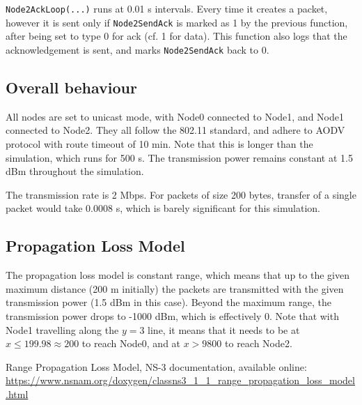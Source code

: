 \documentclass[11pt,journal]{article}
\begin{document}
	\texttt{Node2AckLoop(...)} runs at 0.01 s intervals. Every time it creates a packet, however it is sent only if \texttt{Node2SendAck} is marked as 1 by the previous function, after being set to type 0 for ack (cf. 1 for data). This function also logs that the acknowledgement is sent, and marks \texttt{Node2SendAck} back to 0.
	
	\subsection{Overall behaviour}
	
	All nodes are set to unicast mode, with Node0 connected to Node1, and Node1 connected to Node2. They all follow the 802.11 standard, and adhere to AODV protocol with route timeout of 10 min. Note that this is longer than the simulation, which runs for 500 s. The transmission power remains constant at 1.5 dBm throughout the simulation. 
	
	The transmission rate is 2 Mbps. For packets of size 200 bytes, transfer of a single packet would take 0.0008 s, which is barely significant for this simulation.
	
	\subsection{Propagation Loss Model}
	
	The propagation loss model is constant range, which means that up to the given maximum distance (200 m initially) the packets are transmitted with the given transmission power (1.5 dBm in this case). Beyond the maximum range, the transmission power drops to -1000 dBm, which is effectively 0\cite{range loss doc}. Note that with Node1 travelling along the $y=3$ line, it means that it needs to be at $x \leq 199.98 \approx 200$ to reach Node0, and at $ x > 9800$ to reach Node2.
	
	
	
	\begin{thebibliography}{1}
		Range Propagation Loss Model, NS-3 documentation, available online: \url{https://www.nsnam.org/doxygen/classns3_1_1_range_propagation_loss_model.html}
	\end{thebibliography}
\end{document}
